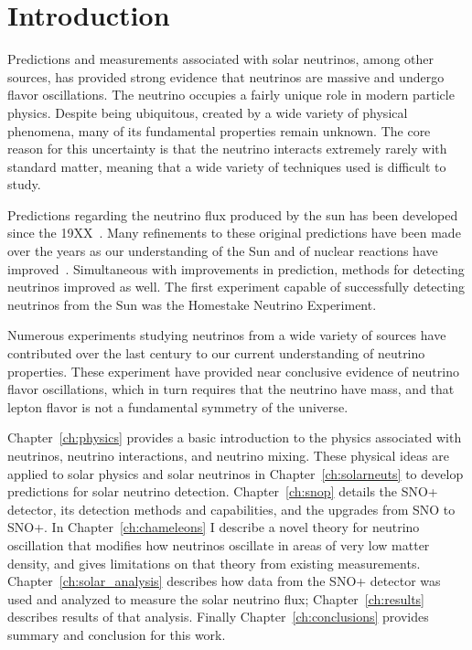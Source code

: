 
\chapter{Introduction}

\ifpdf
    \graphicspath{{introduction/figures/PNG/}{introduction/figures/PDF/}{introduction/figures/}}
\else
    \graphicspath{{introduction/figures/EPS/}{introduction/figures/}}
\fi


Predictions and measurements associated with solar neutrinos, among other
sources, has provided strong evidence that neutrinos are massive and undergo
flavor oscillations.
The neutrino occupies a fairly unique role in modern particle physics.
Despite being ubiquitous, created by a wide variety of physical phenomena,
many of its fundamental properties remain unknown.
The core reason for this uncertainty is that the neutrino interacts extremely rarely
with standard matter, meaning that a wide variety of techniques used
is difficult to study.

Predictions regarding the neutrino flux produced by the sun has been developed
since the 19XX~\citep{XXX}. Many refinements to these original predictions have
been made over the years as our understanding of the Sun and of nuclear reactions
have improved~\citep{XXX,XXX,XXX}.
Simultaneous with improvements in prediction, methods for detecting neutrinos
improved as well. The first experiment capable of successfully detecting
neutrinos from the Sun was the Homestake Neutrino Experiment.

Numerous experiments studying neutrinos from a wide variety of sources have
contributed over the last century to our current understanding of neutrino
properties.
These experiment have provided near conclusive evidence of neutrino flavor
oscillations, which in turn requires that the neutrino have mass, and that
lepton flavor is not a fundamental symmetry of the universe.

Chapter~\ref{ch:physics} provides a basic introduction to the physics associated
with neutrinos, neutrino interactions, and neutrino mixing.
These physical ideas are applied to solar physics and solar neutrinos in Chapter~\ref{ch:solarneuts}
to develop predictions for solar neutrino detection.
Chapter~\ref{ch:snop} details the SNO+ detector, its detection methods and
capabilities, and the upgrades from SNO to SNO+.
In Chapter~\ref{ch:chameleons} I describe a novel theory for neutrino oscillation
that modifies how neutrinos oscillate in areas of very low matter density,
and gives limitations on that theory from existing measurements.
Chapter~\ref{ch:solar_analysis} describes how data from the SNO+ detector
was used and analyzed to measure the solar neutrino flux;
Chapter~\ref{ch:results} describes results of that analysis.
Finally Chapter~\ref{ch:conclusions} provides summary and conclusion for
this work.
